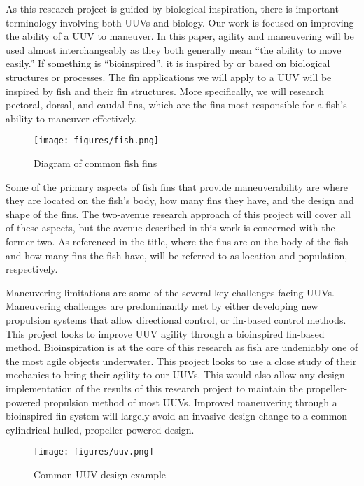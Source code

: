 \documentclass{IEEEtran}
\begin{document}
As this research project is guided by biological inspiration, there is important terminology involving both UUVs and biology. Our work is focused on improving the ability of a UUV to maneuver. In this paper, agility and maneuvering will be used almost interchangeably as they both generally mean ``the ability to move easily.'' If something is ``bioinspired'', it is inspired by or based on biological structures or processes. The fin applications we will apply to a UUV will be inspired by fish and their fin structures. More specifically, we will research pectoral, dorsal, and caudal fins, which are the fins most responsible for a fish’s ability to maneuver effectively.
\begin{figure}
\begin{center}
\texttt{[image: figures/fish.png]}
\end{center}
\caption{Diagram of common fish fins}
\label{fig:1}
\end{figure}

Some of the primary aspects of fish fins that provide maneuverability are where they are located on the fish’s body, how many fins they have, and the design and shape of the fins. The two-avenue research approach of this project will cover all of these aspects, but the avenue described in this work is concerned with the former two. As referenced in the title, where the fins are on the body of the fish and how many fins the fish have, will be referred to as location and population, respectively.

Maneuvering limitations are some of the several key challenges facing UUVs. Maneuvering challenges are predominantly met by either developing new propulsion systems that allow directional control, or fin-based control methods. This project looks to improve UUV agility through a bioinspired fin-based method. Bioinspiration is at the core of this research as fish are undeniably one of the most agile objects underwater. This project looks to use a close study of their mechanics to bring their agility to our UUVs. This would also allow any design implementation of the results of this research project to maintain the propeller-powered propulsion method of most UUVs. Improved maneuvering through a bioinspired fin system will largely avoid an invasive design change to a common cylindrical-hulled, propeller-powered design.
\begin{figure}
\begin{center}
\texttt{[image: figures/uuv.png]}
\end{center}
\caption{Common UUV design example}
\label{fig:2}
\end{figure}
\end{document}
